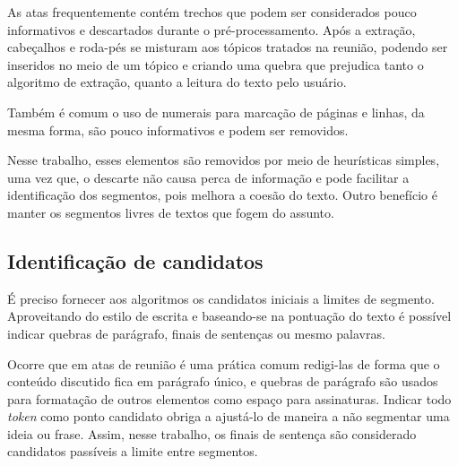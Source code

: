 As atas frequentemente contém trechos que podem ser considerados pouco informativos e descartados durante o pré-processamento. 
Após a extração, cabeçalhos e roda-pés se misturam aos tópicos tratados na reunião, podendo ser  inseridos no meio de um tópico e criando uma quebra que prejudica tanto o algoritmo de extração, quanto a leitura do texto pelo usuário.

Também é comum o uso de numerais para marcação de páginas e linhas, da mesma forma, são pouco informativos e podem ser removidos.

Nesse trabalho, esses elementos são removidos por meio de heurísticas simples, uma vez que, o descarte não causa perca de informação e pode facilitar a identificação dos segmentos, pois melhora a coesão do texto. Outro benefício é manter os segmentos livres de textos que fogem do assunto.



		





	

\subsection{Identificação de candidatos}
	\label{subsec:indentificacaosentencas}
	
	É preciso fornecer aos algoritmos os candidatos iniciais a limites de segmento. Aproveitando do estilo de escrita e baseando-se na pontuação do texto é possível indicar quebras de parágrafo, finais de sentenças ou mesmo palavras. 

	Ocorre que em atas de reunião é uma prática comum redigi-las de forma que o conteúdo discutido fica em parágrafo único, e quebras de parágrafo são usados para formatação de outros elementos como espaço para assinaturas. Indicar todo \textit{token} como ponto candidato obriga a ajustá-lo de maneira a não segmentar uma ideia ou frase. Assim, nesse trabalho, os finais de sentença são considerado candidatos passíveis a limite entre segmentos. 
	

